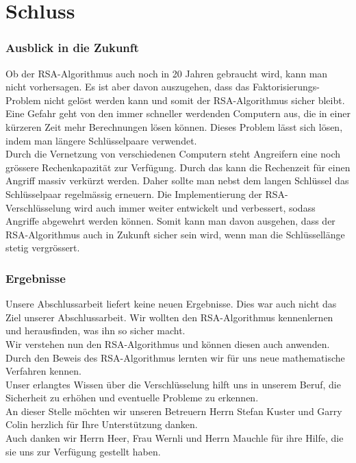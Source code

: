 \part{Schluss}
\section{Ausblick in die Zukunft}
Ob der RSA-Algorithmus auch noch in 20 Jahren gebraucht wird, kann man nicht vorhersagen. Es ist aber davon auszugehen, dass das Faktorisierungs-Problem nicht gelöst werden kann und somit der RSA-Algorithmus sicher bleibt.\\
Eine Gefahr geht von den immer schneller werdenden Computern aus, die in einer kürzeren Zeit mehr Berechnungen lösen können. Dieses Problem lässt sich lösen, indem man längere Schlüsselpaare verwendet.\\
Durch die Vernetzung von verschiedenen Computern steht Angreifern eine noch grössere Rechenkapazität zur Verfügung. Durch das kann die Rechenzeit für einen Angriff massiv verkürzt werden. Daher sollte man nebst dem langen Schlüssel das Schlüsselpaar regelmässig erneuern.
%
Die Implementierung der RSA-Verschlüsselung wird auch immer weiter entwickelt und verbessert, sodass Angriffe abgewehrt werden können.
Somit kann man davon ausgehen, dass der RSA-Algorithmus auch in Zukunft sicher sein wird, wenn man die Schlüssellänge stetig vergrössert.
\section{Ergebnisse}
Unsere Abschlussarbeit liefert keine neuen Ergebnisse. Dies war auch nicht das Ziel unserer Abschlussarbeit. Wir wollten den RSA-Algorithmus kennenlernen und herausfinden, was ihn so sicher macht.\\
Wir verstehen nun den RSA-Algorithmus und können diesen auch anwenden. Durch den Beweis des RSA-Algorithmus lernten wir für uns neue mathematische Verfahren kennen.\\
Unser erlangtes Wissen über die Verschlüsselung hilft uns in unserem Beruf, die Sicherheit zu erhöhen und eventuelle Probleme zu erkennen.
%
\\[2ex]
An dieser Stelle möchten wir unseren Betreuern Herrn Stefan Kuster und Garry Colin herzlich für Ihre Unterstützung danken.\\
Auch danken wir Herrn Heer, Frau Wernli und Herrn Mauchle für ihre Hilfe, die sie uns zur Verfügung gestellt haben.
\newpage
